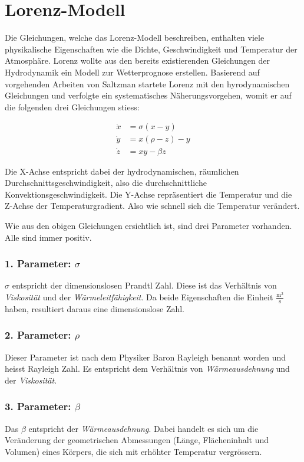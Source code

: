 

\section{Lorenz-Modell}\label{lorenz-modell}
Die Gleichungen, welche das Lorenz-Modell beschreiben, enthalten viele physikalische Eigenschaften wie die Dichte, Geschwindigkeit und Temperatur der Atmosphäre. Lorenz wollte aus den bereits existierenden Gleichungen der Hydrodynamik ein Modell zur Wetterprognose erstellen. Basierend auf vorgehenden Arbeiten von Saltzman \cite{saltzman62} startete Lorenz mit den hyrodynamischen Gleichungen und verfolgte ein systematisches Näherungsvorgehen, womit er auf die folgenden drei Gleichungen stiess:

\begin{align}
\dot{x} &= \sigma(x - y)\\
\dot{y} &= x(\rho - z) - y\\
\dot{z} &= xy - \beta z
\end{align}

Die X-Achse entspricht dabei der hydrodynamischen, räumlichen Durchschnittsgeschwindigkeit, also die durchschnittliche Konvektionsgeschwindigkeit. Die Y-Achse repräsentiert die Temperatur und die Z-Achse der Temperaturgradient. Also wie schnell sich die Temperatur verändert. 

Wie aus den obigen Gleichungen ersichtlich ist, sind drei Parameter vorhanden. Alle sind immer positiv.

\subsubsection{1. Parameter: $\sigma$}
$\sigma$ entspricht der dimensionslosen Prandtl Zahl. Diese ist das Verhältnis von \textit{Viskosität} und der \textit{Wärmeleitfähigkeit}. Da beide Eigenschaften die Einheit $\frac{\text{m}^2}{\text{s}}$ haben, resultiert daraus eine dimensionslose Zahl.

\subsubsection{2. Parameter: $\rho$}
Dieser Parameter ist nach dem Physiker Baron Rayleigh benannt worden und heisst Rayleigh Zahl. Es entspricht dem Verhältnis von \textit{Wärmeausdehnung} und der \textit{Viskosität}.

\subsubsection{3. Parameter: $\beta$}
Das $ \beta $ entspricht der \textit{Wärmeausdehnung}. Dabei handelt es sich um die Veränderung der geometrischen Abmessungen (Länge, Flächeninhalt und Volumen) eines Körpers, die sich mit erhöhter Temperatur vergrössern.


